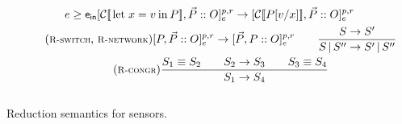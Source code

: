 \begin{myfigure}
\begin{gather*}
{      e \geq \energyIn
    }
    {
      \sensor {\context{\Let x v P}, \vec P} O p r e 
      \reduces
      \sensor {\context{P \subs v x}, \vec P} O p r e
    }
    \\[\rulespace]
    \tag{\Rswitch, \Rnetwork}
    \sensor {P, \vec P} O p r e
    \reduces
    \sensor {\vec P, P} O p r e
    \qquad
    \frac{
      S \reduces S'
    }
    {
      S \parn S''
      \reduces
      S' \parn S''
    }
    \\[\rulespace]
    \tag{\Rcongr}
    \frac{
      S_1 \congr S_2 
      \qquad
      S_2 \reduces S_3
      \qquad
      S_3 \congr S_4
    }{
      S_1 \reduces S_4
    }
\end{gather*}
\\[-0.4cm]
\caption{Reduction semantics for sensors.}
\label{fig:reduction-semantics}
\end{myfigure}


